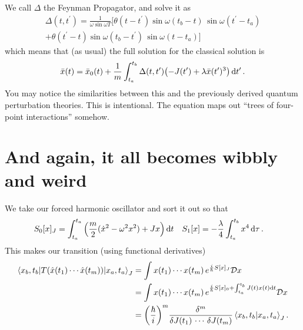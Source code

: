 \documentclass[]{revision-notes}
\begin{document}
We call \(\Delta\) the Feynman Propagator, and solve it as
\begin{multline*}
  \Delta(t, t^\prime) = \frac{1}{\omega \sin\omega T}\big[\theta(t - t^\prime)\sin\omega(t_b - t)\,\sin\omega(t^\prime-t_a) \\+ \theta(t^\prime - t)\sin\omega(t_b - t^\prime)\,\sin\omega(t-t_a)\big]
\end{multline*}
which means that (as usual) the full solution for the classical solution is
\begin{align*}
  \bar{x}(t) = \bar{x}_0(t) + \frac{1}{m}\int_{t_a}^{t_b} \Delta(t, t^\prime) \qty(-J(t^\prime) + \lambda \bar{x}(t^\prime)^3) \dd{t^\prime}.
\end{align*}
You may notice the similarities between this and the previously derived quantum perturbation theories.
This is intentional.
The equation maps out ``trees of four-point interactions'' somehow.

\section{And again, it all becomes wibbly and weird}
We take our forced harmonic oscillator and sort it out so that
\begin{align*}
  S_0[x]_J &= \int_{t_a}^{t_a} \qty(\frac{m}{2} (\dot{x}^2 - \omega^2 x^2) + Jx)\dd{t} & S_1[x] &= -\frac{\lambda}{4} \int_{t_a}^{t_b} x^4 \dd{\tau}.
\end{align*}
This makes our transition (using functional derivatives)
\begin{align*}
  \mel{x_b, t_b}{T(\hat{x}(t_1)\cdots\hat{x}(t_m))}{x_a, t_a}_J &= \int x(t_1)\cdots x(t_m)\,e^{\frac{i}{\hbar}S[x]_J} \mathcal{D} x\,\\
  &= \int x(t_1)\cdots x(t_m)\,e^{\frac{i}{\hbar}S[x]_0 + \int_{t_a}^{t_b} J(t) x(t) \dd{t}} \mathcal{D} x\,\\
  &= \qty(\frac{\hbar}{i})^m \frac{\delta^m}{\delta J(t_1)\,\cdots\,\delta J(t_m)} \braket{x_b, t_b}{x_a, t_a}_J.
\end{align*}
\end{document}

